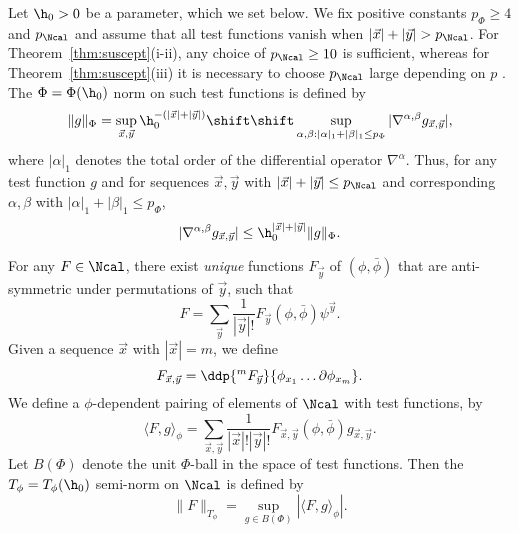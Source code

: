 Let $\h_0 > 0$
be a parameter, which we set below.
We fix positive constants $p_\Phi\ge 4$ and
$p_\Ncal$
and assume that all test functions
vanish when $|\vec x|  +|\vec y| > p_\Ncal$.
For Theorem~\ref{thm:suscept}(i-ii), any choice of $p_\Ncal \ge 10$ is sufficient,
whereas for Theorem~\ref{thm:suscept}(iii) it is necessary to choose $p_\Ncal$ large
depending on $p$ \cite{BSTW-clp}.
The $\Phi = \Phi(\h_0)$ norm on such test functions is defined by
\begin{equation}
\|g\|_\Phi
  =
    \sup_{\vec x, \vec y} \h_0^{-(|\vec x| +|\vec y|)}
    \shift\shift \sup_{\alpha,\beta: |\alpha|_1+|\beta|_1 \le p_\Phi}
    |\nabla^{\alpha,\beta} g_{\vec x, \vec y}|,
\end{equation}
where $|\alpha|_1$ denotes the total order of the differential operator $\nabla^\alpha$.
Thus, for any test function $g$ and for sequences
$\vec x, \vec y$ with $|\vec x| +|\vec y| \leq p_\Ncal$ and
corresponding $\alpha, \beta$ with $|\alpha|_1 + |\beta|_1 \leq p_\Phi$,
\begin{equation}
\label{e:testfcnbd}
|\nabla^{\alpha,\beta} g_{\vec x,\vec y}| \leq \h_0^{|\vec x| + |\vec y|} \|g\|_\Phi.
\end{equation}

For any $F \in \Ncal$,
there exist \emph{unique} functions $F_{\vec y}$ of $(\phi, \bar\phi)$
that are anti-symmetric under permutations of $\vec y$, such that
\begin{equation}
F = \sum_{\vec y} \frac{1}{|\vec y|!} F_{\vec y}(\phi, \bar\phi) \psi^{\vec y}.
\end{equation}
Given a sequence $\vec{x}$ with $|\vec{x}| = m$, we define
\begin{equation}
F_{\vec x, \vec y} = \ddp{^m F_{\vec y}}{\phi_{x_1} \ldots \partial\phi_{x_m}}.
\end{equation}
We define a $\phi$-dependent pairing of elements of $\Ncal$ with test functions, by
\begin{equation}
\langle F, g \rangle_\phi
  =
\sum_{\vec x, \vec y} \frac{1}{|\vec x|! |\vec y|!} F_{\vec x,\vec y}(\phi, \bar\phi) g_{\vec x,\vec y}.
\end{equation}
Let $B(\Phi)$ denote the unit $\Phi$-ball
in the space of test functions. Then the
$T_\phi = T_\phi(\h_0)$ semi-norm on $\Ncal$
is defined by
\begin{equation}
\|F\|_{T_\phi} = \sup_{g\in B(\Phi)} |\langle F, g \rangle_\phi|.
\end{equation}

